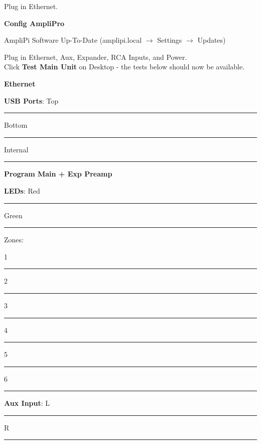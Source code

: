 \documentclass{article}
\begin{document}
\bigskip
Plug in Ethernet.

\begin{checklist}
  \item \textbf{Config AmpliPro}
  \item AmpliPi Software Up-To-Date (amplipi.local $\rightarrow$ Settings $\rightarrow$ Updates)
\end{checklist}

Plug in Ethernet, Aux, Expander, RCA Inputs, and Power. \\
Click \textbf{Test Main Unit} on Desktop - the tests below should now be available.

\begin{checklist}
  \item \textbf{Ethernet}
\end{checklist}

\begin{checklist}
  \item \textbf{USB Ports}: Top \rule{2em}{0.4pt} Bottom \rule{2em}{0.4pt} Internal \rule{2em}{0.4pt}
  \item \textbf{Program Main + Exp Preamp}
  \item \textbf{LEDs}: Red \rule{2em}{0.4pt} Green \rule{2em}{0.4pt} Zones:
  \item[] \hspace{3em} 1 \rule{2em}{0.4pt} 2 \rule{2em}{0.4pt} 3 \rule{2em}{0.4pt}
          4 \rule{2em}{0.4pt} 5 \rule{2em}{0.4pt} 6 \rule{2em}{0.4pt}
\end{checklist}

\begin{checklist}
  \item \textbf{Aux Input}: L \rule{2em}{0.4pt} R \rule{2em}{0.4pt}
\end{checklist}
\end{document}
